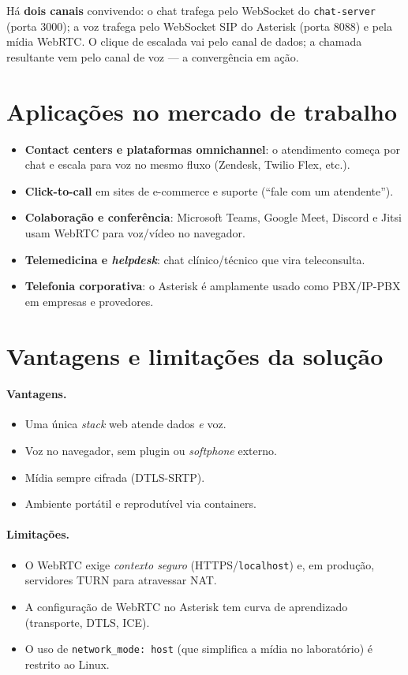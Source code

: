 \documentclass[11pt,a4paper]{article}
\begin{document}
\noindent Há \textbf{dois canais} convivendo: o chat trafega pelo WebSocket do
\verb|chat-server| (porta 3000); a voz trafega pelo WebSocket SIP do Asterisk (porta 8088) e
pela mídia WebRTC. O clique de escalada vai pelo canal de dados; a chamada resultante vem pelo
canal de voz --- a convergência em ação.

\section{Aplicações no mercado de trabalho}

\begin{itemize}[nosep]
  \item \textbf{Contact centers e plataformas omnichannel}: o atendimento começa por chat e
  escala para voz no mesmo fluxo (Zendesk, Twilio Flex, etc.).
  \item \textbf{Click-to-call} em sites de e-commerce e suporte (``fale com um atendente'').
  \item \textbf{Colaboração e conferência}: Microsoft Teams, Google Meet, Discord e Jitsi
  usam WebRTC para voz/vídeo no navegador.
  \item \textbf{Telemedicina e \emph{helpdesk}}: chat clínico/técnico que vira teleconsulta.
  \item \textbf{Telefonia corporativa}: o Asterisk é amplamente usado como PBX/IP-PBX em
  empresas e provedores.
\end{itemize}

\section{Vantagens e limitações da solução}

\paragraph{Vantagens.}
\begin{itemize}[nosep]
  \item Uma única \emph{stack} web atende dados \emph{e} voz.
  \item Voz no navegador, sem plugin ou \emph{softphone} externo.
  \item Mídia sempre cifrada (DTLS-SRTP).
  \item Ambiente portátil e reprodutível via containers.
\end{itemize}

\paragraph{Limitações.}
\begin{itemize}[nosep]
  \item O WebRTC exige \emph{contexto seguro} (HTTPS/\verb|localhost|) e, em produção,
  servidores TURN para atravessar NAT.
  \item A configuração de WebRTC no Asterisk tem curva de aprendizado (transporte, DTLS, ICE).
  \item O uso de \verb|network_mode: host| (que simplifica a mídia no laboratório) é restrito
  ao Linux.
\end{itemize}
\end{document}
